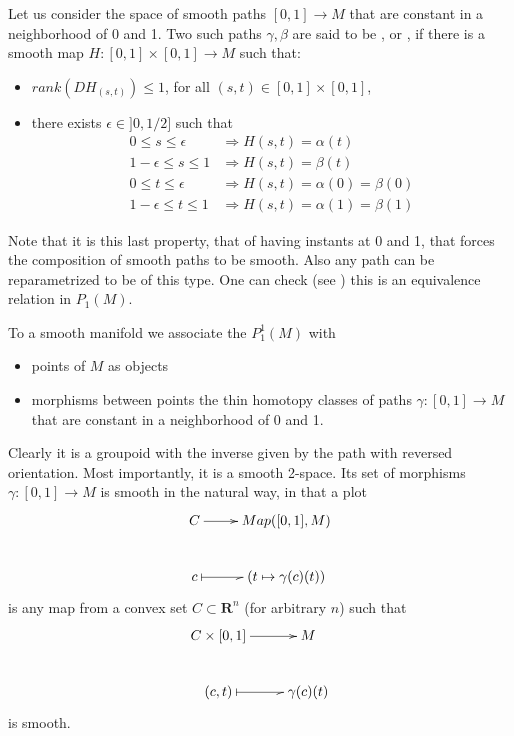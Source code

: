 \begin{definition}
Let us consider the space  of smooth paths $[0,1]\rightarrow M$ that are constant in a neighborhood of 0 and 1.
 Two such paths $\gamma,\beta$ are said to be , or , if there is a smooth map $H:[0,1]\times [0,1]\rightarrow M$ such that:
\begin{itemize}
 \item $rank(DH_{(s,t)})\leq 1$, for all $(s,t)\in [0,1]\times [0,1]$,
\item there exists $\epsilon\in ]0,1/2]$ such that\begin{align*}
                                                     0\leq s \leq \epsilon &\Rightarrow H(s,t)=\alpha(t)\\
						    1-\epsilon \leq s \leq 1 &\Rightarrow H(s,t)=\beta(t)\\
						    0\leq t\leq \epsilon &\Rightarrow H(s,t)=\alpha (0)=\beta(0)\\
						   1-\epsilon\leq t\leq 1 &\Rightarrow H(s,t)=\alpha(1)=\beta(1)
                                                    \end{align*}

\end{itemize}
\end{definition}
Note that it is this last property, that of having  instants at 0 and 1, that forces the composition of smooth paths to be smooth. Also any path can be reparametrized to be of this type. One can check (see \cite{picken_holonomy}) this is an equivalence relation in $P_1(M)$.
\begin{definition}
 To a smooth manifold we associate the  $P_1^1(M)$ with
\begin{itemize}
 \item points of $M$ as objects
\item morphisms between points the thin homotopy classes of paths $\gamma:[0,1]\rightarrow M$ that are constant in a neighborhood of 0 and 1.
\end{itemize}
\end{definition}

Clearly it is a groupoid with the inverse given by the path with reversed orientation. Most importantly, it is a smooth 2-space. Its set of morphisms $\gamma:[0,1]\rightarrow M$ is smooth in the natural way, in that a plot \[
\xymatrix{C\ar[r] & Map([0,1],M)   \\
c\ar@{|-_{>}}[r] & (t\mapsto \gamma (c)(t))}
\]
 is any map from a convex set $C\subset \mathbf{R}^n$ (for arbitrary $n$) such that \[
                       \xymatrix{ C\times [0,1] \ar[r] & M\\
(c,t)\ar@{|-_{>}}[r] & \gamma(c)(t)}
                      \]
is smooth.

